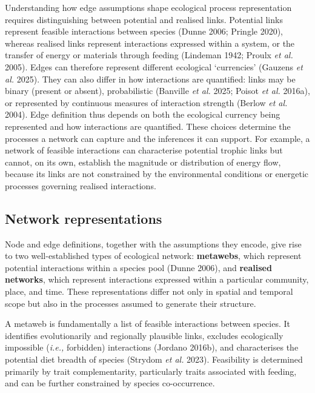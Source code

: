 \documentclass[
]{article}
\begin{document}
Understanding how edge assumptions shape ecological process
representation requires distinguishing between potential and realised
links. Potential links represent feasible interactions between species
(Dunne 2006; Pringle 2020), whereas realised links represent
interactions expressed within a system, or the transfer of energy or
materials through feeding (Lindeman 1942; Proulx \emph{et al.} 2005).
Edges can therefore represent different ecological `currencies' (Gauzens
\emph{et al.} 2025). They can also differ in how interactions are
quantified: links may be binary (present or absent), probabilistic
(Banville \emph{et al.} 2025; Poisot \emph{et al.} 2016a), or
represented by continuous measures of interaction strength (Berlow
\emph{et al.} 2004). Edge definition thus depends on both the ecological
currency being represented and how interactions are quantified. These
choices determine the processes a network can capture and the inferences
it can support. For example, a network of feasible interactions can
characterise potential trophic links but cannot, on its own, establish
the magnitude or distribution of energy flow, because its links are not
constrained by the environmental conditions or energetic processes
governing realised interactions.

\subsection{Network representations}\label{sec-representation}

Node and edge definitions, together with the assumptions they encode,
give rise to two well-established types of ecological network:
\textbf{metawebs}, which represent potential interactions within a
species pool (Dunne 2006), and \textbf{realised networks}, which
represent interactions expressed within a particular community, place,
and time. These representations differ not only in spatial and temporal
scope but also in the processes assumed to generate their structure.

A metaweb is fundamentally a list of feasible interactions between
species. It identifies evolutionarily and regionally plausible links,
excludes ecologically impossible (\emph{i.e.,} forbidden) interactions
(Jordano 2016b), and characterises the potential diet breadth of species
(Strydom \emph{et al.} 2023). Feasibility is determined primarily by
trait complementarity, particularly traits associated with feeding, and
can be further constrained by species co-occurrence.
\end{document}
